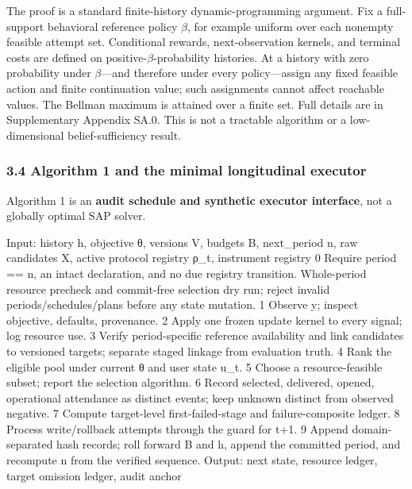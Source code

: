\documentclass[
  11pt]{article}
\newenvironment{Shaded}{}{}
\newcommand{\NormalTok}[1]{#1}
\newcommand{\Needspace}[1]{%
  \par
  \ifdim\pagegoal>\pagetotal
    \ifdim\dimexpr\pagegoal-\pagetotal\relax<#1\relax
      \newpage
    \fi
  \fi
}
\begin{document}
The proof is a standard finite-history dynamic-programming argument. Fix
a full-support behavioral reference policy \(\beta\), for example
uniform over each nonempty feasible attempt set. Conditional rewards,
next-observation kernels, and terminal costs are defined on
positive-\(\beta\)-probability histories. At a history with zero
probability under \(\beta\)---and therefore under every policy---assign
any fixed feasible action and finite continuation value; such
assignments cannot affect reachable values. The Bellman maximum is
attained over a finite set. Full details are in Supplementary Appendix
SA.0. This is not a tractable algorithm or a low-dimensional
belief-sufficiency result.

\Needspace{30em}

\subsubsection{3.4 Algorithm 1 and the minimal longitudinal
executor}\label{algorithm-1-and-the-minimal-longitudinal-executor}

Algorithm 1 is an \textbf{audit schedule and synthetic executor
interface}, not a globally optimal SAP solver.

\begin{Shaded}
\begin{Highlighting}[]
\NormalTok{Input: history h, objective θ, versions V, budgets B, next\_period n,}
\NormalTok{       raw candidates X, active protocol registry ρ\_t, instrument registry}
\NormalTok{ 0  Require period == n, an intact declaration, and no due}
\NormalTok{    registry transition. Whole{-}period resource precheck and}
\NormalTok{    commit{-}free selection dry run; reject invalid}
\NormalTok{    periods/schedules/plans before any state mutation.}
\NormalTok{ 1  Observe y; inspect objective, defaults, provenance.}
\NormalTok{ 2  Apply one frozen update kernel to every signal; log resource use.}
\NormalTok{ 3  Verify period{-}specific reference availability and link candidates}
\NormalTok{    to versioned targets; separate staged linkage from evaluation truth.}
\NormalTok{ 4  Rank the eligible pool under current θ and user state u\_t.}
\NormalTok{ 5  Choose a resource{-}feasible subset; report the selection algorithm.}
\NormalTok{ 6  Record selected, delivered, opened, operational attendance as}
\NormalTok{    distinct events; keep unknown distinct from observed negative.}
\NormalTok{ 7  Compute target{-}level first{-}failed{-}stage and failure{-}composite ledger.}
\NormalTok{ 8  Process write/rollback attempts through the guard for t+1.}
\NormalTok{ 9  Append domain{-}separated hash records; roll forward B and h, append the}
\NormalTok{    committed period, and recompute n from the verified sequence.}
\NormalTok{Output: next state, resource ledger, target omission ledger, audit anchor}
\end{Highlighting}
\end{Shaded}
\end{document}
